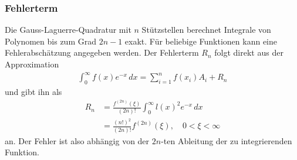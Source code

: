 \subsubsection{Fehlerterm}
Die Gauss-Laguerre-Quadratur mit $n$ Stützstellen berechnet Integrale
von Polynomen bis zum Grad $2n - 1$ exakt.
Für beliebige Funktionen kann eine Fehlerabschätzung angegeben werden.
Der Fehlerterm $R_n$ folgt direkt aus der Approximation
\begin{align*}
\int_0^{\infty} f(x) e^{-x} \, dx
=
\sum_{i=1}^n f(x_i) A_i + R_n
\end{align*}
und \cite{abramowitz+stegun} gibt ihn als
\begin{align}
R_n
 & =
\frac{f^{(2n)}(\xi)}{(2n)!} \int_0^\infty l(x)^2 e^{-x}\,dx
\\
 & =
\frac{(n!)^2}{(2n)!} f^{(2n)}(\xi)
,\quad
0 < \xi < \infty
\label{laguerre:lag_error}
\end{align}
an.
Der Fehler ist also abhängig von der $2n$-ten Ableitung
der zu integrierenden Funktion.
